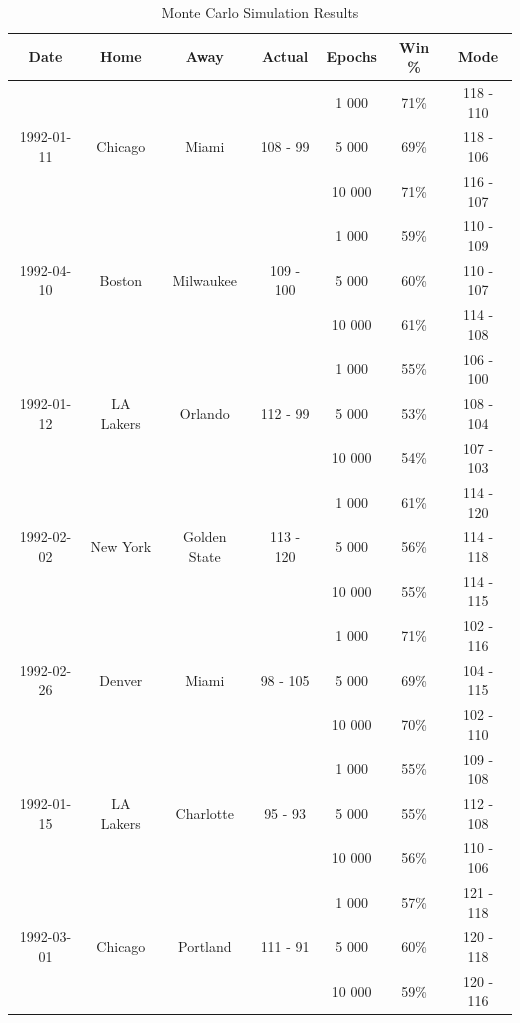 \documentclass{thesis-ekf}
\theoremstyle{definition}
\theoremstyle{remark}
\begin{document}
\begin{table}[htbp]
	\centering
	\begin{tabular}{|c|c|c|c|c|c|c|}
		\hline
		\textbf{Date} & \textbf{Home} & \textbf{Away} & \textbf{Actual} & \textbf{Epochs} & \textbf{Win \%} & \textbf{Mode} \\
		\hline
		\multirow{3}{*}{1992-01-11} & \multirow{3}{*}{Chicago} & \multirow{3}{*}{Miami} & \multirow{3}{*}{108 - 99} & 1 000 & 71\% & 118 - 110 \\
		&  &  &  & 5 000 & 69\% & 118 - 106 \\
		&  &  &  & 10 000 & 71\% & 116 - 107 \\
		\hline
		\multirow{3}{*}{1992-04-10} & \multirow{3}{*}{Boston} & \multirow{3}{*}{Milwaukee} & \multirow{3}{*}{109 - 100} & 1 000 & 59\% & 110 - 109 \\
		&  &  &  & 5 000 & 60\% & 110 - 107 \\
		&  &  &  & 10 000 & 61\% & 114 - 108 \\
		\hline
		\multirow{3}{*}{1992-01-12} & \multirow{3}{*}{LA Lakers} & \multirow{3}{*}{Orlando} & \multirow{3}{*}{112 - 99} & 1 000 & 55\% & 106 - 100 \\
		&  &  &  & 5 000 & 53\% & 108 - 104 \\
		&  &  &  & 10 000 & 54\% & 107 - 103\\
		\hline
		\multirow{3}{*}{1992-02-02} & \multirow{3}{*}{New York} & \multirow{3}{*}{Golden State} & \multirow{3}{*}{113 - 120} & 1 000 & 61\% & 114 - 120 \\
		&  &  &  & 5 000 & 56\% & 114 - 118 \\
		&  &  &  & 10 000 & 55\% & 114 - 115 \\
		\hline
		\multirow{3}{*}{1992-02-26} & \multirow{3}{*}{Denver} & \multirow{3}{*}{Miami} & \multirow{3}{*}{98 - 105} & 1 000 & 71\% & 102 - 116 \\
		&  &  &  & 5 000 & 69\% & 104 - 115 \\
		&  &  &  & 10 000 & 70\% & 102 - 110 \\
		\hline
		\multirow{3}{*}{1992-01-15} & \multirow{3}{*}{LA Lakers} & \multirow{3}{*}{Charlotte} & \multirow{3}{*}{95 - 93} & 1 000 & 55\% & 109 - 108 \\
		&  &  &  & 5 000 & 55\% & 112 - 108 \\
		&  &  &  & 10 000 & 56\% & 110 - 106 \\
		\hline
		\multirow{3}{*}{1992-03-01} & \multirow{3}{*}{Chicago} & \multirow{3}{*}{Portland} & \multirow{3}{*}{111 - 91} & 1 000 & 57\% & 121 - 118\\
		&  &  &  & 5 000 & 60\% & 120 - 118 \\
		&  &  &  & 10 000 & 59\% & 120 - 116 \\
		\hline
	\end{tabular}
	\caption{Monte Carlo Simulation Results}
	\label{tab-sim-games}
\end{table}
\end{document}

